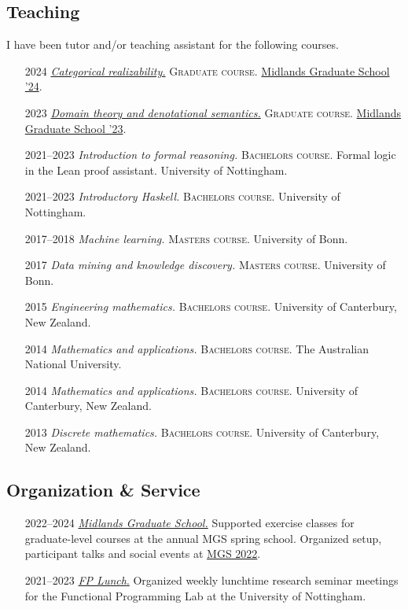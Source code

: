 \documentclass[12pt,a4paper]{article}
\providecommand{\tightlist}{%
  \setlength{\itemsep}{0pt}\setlength{\parskip}{0pt}}
\begin{document}
\subsection{Teaching}

I have been tutor and/or teaching assistant for the following courses.

\begin{itemize}[leftmargin=7ex]
\tightlist
\item[2024]
  \emph{\href{https://github.com/tomdjong/MGS-categorical-realizability}{Categorical realizability.}}
  \textsc{Graduate course.}
  \href{https://www.cs.le.ac.uk/events/mgs2024/}{Midlands Graduate School '24}.
\item[2023]
  \emph{\href{https://github.com/tomdjong/MGS-domain-theory}{Domain theory and denotational semantics.}}
  \textsc{Graduate course.}
  \href{https://www.cs.bham.ac.uk/~mhe/events/MGS23}{Midlands Graduate School '23}.
\item[\small 2021--2023]
  \emph{Introduction to formal reasoning.}
  \textsc{Bachelors course.}
  Formal logic in the Lean proof assistant.
  University of Nottingham.
\item[\small 2021--2023]
  \emph{Introductory Haskell.}
  \textsc{Bachelors course.}
  University of Nottingham.
\item[\small 2017--2018]
  \emph{Machine learning.}
  \textsc{Masters course.}
  University of Bonn.
\item[2017]
  \emph{Data mining and knowledge discovery.}
  \textsc{Masters course.}
  University of Bonn.
\item[2015]
  \emph{Engineering mathematics.}
  \textsc{Bachelors course.}
  University of Canterbury, New Zealand.
\item[2014]
  \emph{Mathematics and applications.}
  \textsc{Bachelors course.}
  The Australian National University.
\item[2014]
  \emph{Mathematics and applications.}
  \textsc{Bachelors course.}
  University of Canterbury, New Zealand.
\item[2013]
  \emph{Discrete mathematics.}
  \textsc{Bachelors course.}
  University of Canterbury, New Zealand.
\end{itemize}

\subsection{Organization \& Service}\label{organization-service}

\begin{itemize}[leftmargin=7ex]
\item[\small 2022--2024]
  \href{http://www.cs.nott.ac.uk/MGS}{\emph{Midlands Graduate School.}}
  Supported exercise classes for graduate-level courses at the annual MGS spring school.
  Organized setup, participant talks and social events at \href{https://www.cs.nott.ac.uk/~psznk/events/mgs22.html}{MGS 2022}.
\item[\small 2021--2023]
  \href{https://www.nottingham.ac.uk/research/groups/fp-lab/fp-lunch/fp-lunch.aspx}{\emph{FP Lunch}.}
  Organized weekly lunchtime research seminar meetings for the Functional Programming Lab at the University of Nottingham.
\end{itemize}
\end{document}
